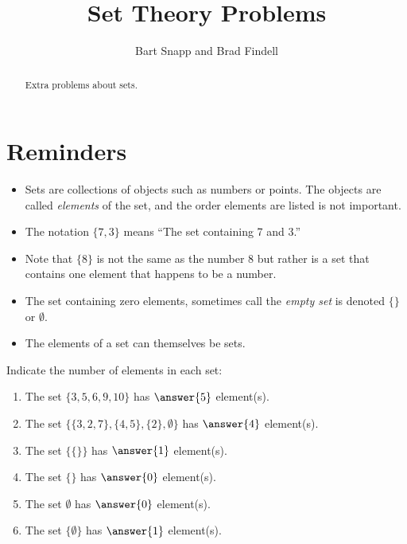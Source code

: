 \documentclass[nooutcomes]{ximera}
\title{Set Theory Problems}
\author{Bart Snapp and Brad Findell}
\begin{document}
\begin{abstract}
Extra problems about sets. 
\end{abstract}
\maketitle

\section{Reminders}
\begin{itemize}
\item Sets are collections of objects such as numbers or points.  The objects are called \emph{elements} of the set, and the order elements are listed is not important.  

\item The notation $\{7, 3\}$ means ``The set containing 7 and 3.''  

\item Note that $\{8\}$ is not the same as the number 8 but rather is a set that contains one element that happens to be a number. 

\item The set containing zero elements, sometimes call the \emph{empty set} is denoted $\{\}$ or $\emptyset$.  

\item The elements of a set can themselves be sets.  

\end{itemize}


\begin{problem}
Indicate the number of elements in each set: 
\begin{enumerate}
\item The set $\{3, 5, 6, 9, 10\}$ has $\answer{5}$ element(s).
\item The set $\{ \{3,2,7\}, \{4,5\}, \{2\}, \emptyset \}$ has $\answer{4}$ element(s).
\item The set $\{ \{ \} \}$ has $\answer{1}$ element(s).
\item The set $\{\}$ has $\answer{0}$ element(s).
\item The set $\emptyset$ has $\answer{0}$ element(s).
\item The set $\{ \emptyset \}$ has $\answer{1}$ element(s).
\end{enumerate}

\end{problem}
\end{document}
